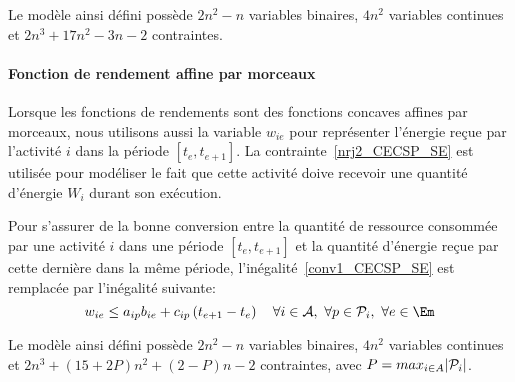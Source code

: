 Le modèle ainsi défini possède $2n^2-n$ variables binaires, $4n^2$
variables continues et $2n^3+17n^2-3n-2$ contraintes.

\paragraph{Fonction de rendement affine par morceaux}

Lorsque les fonctions de rendements sont des fonctions concaves
affines par morceaux, nous utilisons aussi la variable $w_{ie}$ pour
représenter l'énergie reçue par l'activité $i$ dans la période
$[t_e,t_{e+1}]$. La contrainte~\eqref{nrj2_CECSP_SE} est utilisée pour
modéliser le fait que cette activité doive recevoir une quantité
d'énergie $W_i$ durant son exécution.

Pour s'assurer de la bonne conversion entre la quantité de ressource
consommée par une activité $i$ dans une période $[t_e,t_{e+1}]$ et la
quantité d'énergie reçue par cette dernière dans la même période,
l'inégalité~\eqref{conv1_CECSP_SE} est remplacée par l'inégalité
suivante:
\begin{equation}
w_{ie} \le a_{ip}b_{ie} + c_{ip}\left( t_{e+1} - t_e\right) \quad  
\forall i \in \A,\ \forall p \in \P_i,\ \forall e \in \Em
\label{conv2_CECSP_SE}
\end{equation}

Le modèle ainsi défini possède $2n^2-n$ variables binaires, $4n^2$
variables continues et $2n^3+(15 + 2P)n^2+\left(2-P\right)n-2$
contraintes, avec $P=max_{i\in A}|\P_i|$.    
